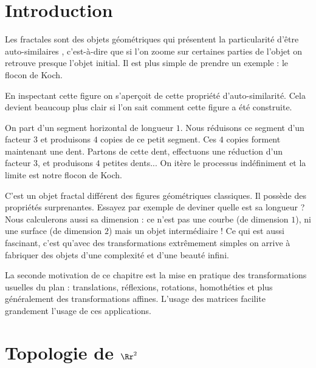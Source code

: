 \documentclass[11pt,class=report,crop=false]{standalone}
\newcommand{\commentfigure}[1]{#1} %
\begin{document}


\section{Introduction}



Les fractales sont des objets géométriques qui présentent la particularité d'être
\og auto-similaires \fg{}, c'est-à-dire que si l'on zoome sur certaines parties de l'objet on retrouve
presque l'objet initial. Il est plus simple de prendre un exemple : le flocon de Koch.

\commentfigure{
}


En inspectant cette figure on s'aperçoit de cette propriété d'auto-similarité.
Cela devient beaucoup plus clair si l'on sait comment cette figure a été construite.

On part d'un segment horizontal de longueur $1$. Nous réduisons ce segment d'un facteur $3$
et produisons $4$ copies de ce petit segment. Ces $4$ copies forment maintenant une dent.
Partons de cette dent, effectuons une réduction d'un facteur $3$, et produisons $4$ petites dents...
On itère le processus indéfiniment et la \og limite \fg{} est notre flocon de Koch.

\commentfigure{
}


C'est un objet \og fractal \fg{} différent des figures géométriques classiques. Il possède des propriétés 
surprenantes. Essayez par exemple de deviner quelle est sa longueur ? Nous calculerons aussi sa dimension :
ce n'est pas une courbe (de dimension $1$), ni une surface (de dimension $2$) mais un objet intermédiaire !
Ce qui est aussi fascinant, c'est qu'avec des transformations extrêmement simples on arrive à fabriquer
des objets d'une complexité et d'une beauté infini.

La seconde motivation de ce chapitre est la mise en pratique des transformations usuelles du plan :
translations, réflexions, rotations, homothéties et plus généralement des transformations affines.
L'usage des matrices facilite grandement l'usage de ces applications.


\section{Topologie de $\Rr^2$}
\end{document}
